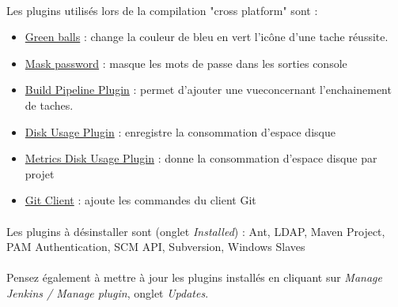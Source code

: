 \documentclass{article}
\begin{document}
\paragraph{}Les plugins utilisés lors de la compilation "cross platform" sont :\\
\begin{itemize}
  \item \href{https://wiki.jenkins-ci.org/display/JENKINS/Green+Balls}{Green balls} : change la couleur 
de bleu en vert l'icône d'une tache réussite. 
  \item \href{https://wiki.jenkins-ci.org/display/JENKINS/Mask+Passwords+Plugin}{Mask password} : masque les mots de passe dans les sorties console
  \item  \href{https://wiki.jenkins-ci.org/display/JENKINS/Build+Pipeline+Plugin}{Build Pipeline Plugin} : permet d'ajouter une vueconcernant l'enchainement de taches. 
  \item \href{https://wiki.jenkins-ci.org/display/JENKINS/Disk+Usage+Plugin}{Disk Usage Plugin} : enregistre la consommation d'espace disque
  \item \href{https://wiki.jenkins-ci.org/display/JENKINS/Metrics+Disk+Usage+Plugin}{Metrics Disk Usage Plugin} : donne la consommation d'espace disque par projet
  \item \href{}{Git Client} : ajoute les commandes du client Git
\end{itemize}

\paragraph{}Les plugins à désinstaller sont (onglet \textit{Installed}) : Ant, LDAP, Maven Project, PAM Authentication, SCM API, Subversion, Windows Slaves

\paragraph{}Pensez également à mettre à jour les plugins installés en cliquant sur \textit{Manage Jenkins / Manage plugin}, onglet \textit{Updates}.
\end{document}
